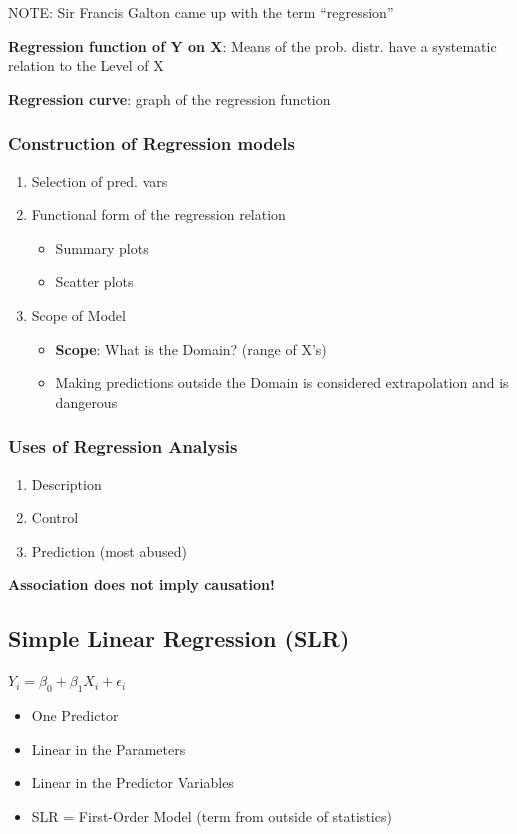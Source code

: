 \documentclass[11pt]{article}
\begin{document}
NOTE: Sir Francis Galton came up with the term ``regression''

\textbf{Regression function of Y on X}: Means of the prob. distr. have a systematic relation to the Level of X

\textbf{Regression curve}: graph of the regression function

\subsubsection{Construction of Regression models}
\label{sec:orga1727f5}
\begin{enumerate}
\item Selection of pred. vars
\item Functional form of the regression relation
\begin{itemize}
\item Summary plots
\item Scatter plots
\end{itemize}
\item Scope of Model
\begin{itemize}
\item \textbf{Scope}: What is the Domain? (range of X's)
\item Making predictions outside the Domain is considered extrapolation and is dangerous
\end{itemize}
\end{enumerate}
\subsubsection{Uses of Regression Analysis}
\label{sec:org9bdf5e8}
\begin{enumerate}
\item Description
\item Control
\item Prediction (most abused)
\end{enumerate}

\textbf{Association does not imply causation!}
\subsection{Simple Linear Regression (SLR)}
\label{sec:org1dd4d7a}

\(Y_i = \beta_0 + \beta_1 X_i + \epsilon_i\)
\begin{itemize}
\item One Predictor
\item Linear in the Parameters
\item Linear in the Predictor Variables
\item SLR = First-Order Model (term from outside of statistics)
\end{itemize}
\end{document}
